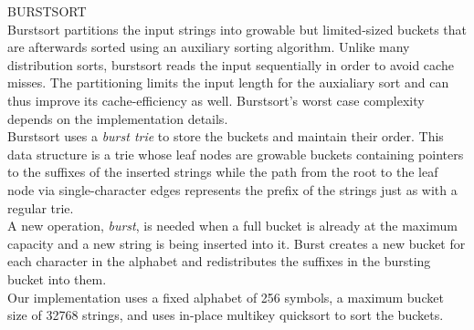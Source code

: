 {\sffamily\small{\color{sciorange} BURSTSORT}}\vspace{1mm}\\
\footnotesize Burstsort partitions the input strings into growable but
limited-sized buckets that are afterwards sorted using an auxiliary
sorting algorithm. Unlike many distribution sorts, burstsort reads the
input sequentially in order to avoid cache misses.  The partitioning
limits the input length for the auxialiary sort and can thus improve
its cache-efficiency as well. Burstsort's worst case complexity
depends on the implementation details.\\

Burstsort uses a \emph{burst trie} to store the buckets and maintain
their order. This data structure is a trie whose leaf nodes are
growable buckets containing pointers to the suffixes of the inserted
strings while the path from the root to the leaf node via
single-character edges represents the prefix of the strings just as
with a regular trie.\\

A new operation, \emph{burst}, is needed when a full bucket is already
at the maximum capacity and a new string is being inserted into
it. Burst creates a new bucket for each character in the alphabet and
redistributes the suffixes in the bursting bucket into them.\\

Our implementation uses a fixed alphabet of 256 symbols, a maximum
bucket size of 32768 strings, and uses in-place multikey quicksort to
sort the buckets.
